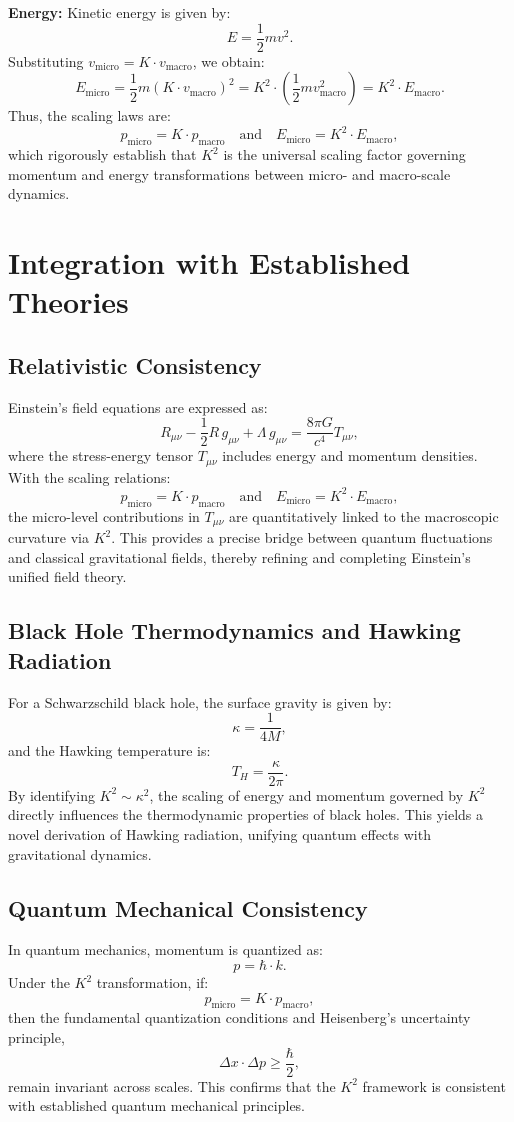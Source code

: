 \documentclass{article}
\begin{document}
\textbf{Energy:} Kinetic energy is given by:
\[
E = \frac{1}{2} m v^2.
\]
Substituting \(v_{\text{micro}} = K \cdot v_{\text{macro}}\), we obtain:
\[
E_{\text{micro}} = \frac{1}{2} m (K \cdot v_{\text{macro}})^2 = K^2 \cdot \left(\frac{1}{2} m v_{\text{macro}}^2\right) = K^2 \cdot E_{\text{macro}}.
\]
Thus, the scaling laws are:
\[
p_{\text{micro}} = K \cdot p_{\text{macro}} \quad \text{and} \quad E_{\text{micro}} = K^2 \cdot E_{\text{macro}},
\]
which rigorously establish that \(K^2\) is the universal scaling factor governing momentum and energy transformations between micro- and macro-scale dynamics.

\section{Integration with Established Theories}
\subsection{Relativistic Consistency}
Einstein's field equations are expressed as:
\[
R_{\mu \nu} - \frac{1}{2} R \, g_{\mu \nu} + \Lambda \, g_{\mu \nu} = \frac{8\pi G}{c^4} T_{\mu \nu},
\]
where the stress-energy tensor \(T_{\mu \nu}\) includes energy and momentum densities. With the scaling relations:
\[
p_{\text{micro}} = K \cdot p_{\text{macro}} \quad \text{and} \quad E_{\text{micro}} = K^2 \cdot E_{\text{macro}},
\]
the micro-level contributions in \(T_{\mu \nu}\) are quantitatively linked to the macroscopic curvature via \(K^2\). This provides a precise bridge between quantum fluctuations and classical gravitational fields, thereby refining and completing Einstein's unified field theory.

\subsection{Black Hole Thermodynamics and Hawking Radiation}
For a Schwarzschild black hole, the surface gravity is given by:
\[
\kappa = \frac{1}{4M},
\]
and the Hawking temperature is:
\[
T_H = \frac{\kappa}{2\pi}.
\]
By identifying \(K^2 \sim \kappa^2\), the scaling of energy and momentum governed by \(K^2\) directly influences the thermodynamic properties of black holes. This yields a novel derivation of Hawking radiation, unifying quantum effects with gravitational dynamics.

\subsection{Quantum Mechanical Consistency}
In quantum mechanics, momentum is quantized as:
\[
p = \hbar \cdot k.
\]
Under the \(K^2\) transformation, if:
\[
p_{\text{micro}} = K \cdot p_{\text{macro}},
\]
then the fundamental quantization conditions and Heisenberg's uncertainty principle,
\[
\Delta x \cdot \Delta p \geq \frac{\hbar}{2},
\]
remain invariant across scales. This confirms that the \(K^2\) framework is consistent with established quantum mechanical principles.
\end{document}
